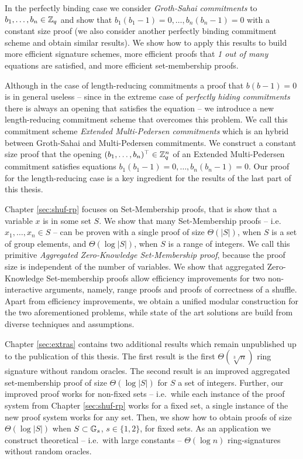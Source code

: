 In the perfectly binding case we consider \emph{Groth-Sahai commitments} to $b_1,\ldots,\allowbreak b_n\allowbreak\in\mathbb{Z}_q$ and show that $b_1(b_1-1)=0,\ldots,b_n(b_n-1)=0$ with a constant size proof (we also consider another perfectly binding commitment scheme and obtain similar results). We show how to apply this results to build more efficient signature schemes, more efficient proofs that \emph{1 out of many} equations are satisfied, and more efficient set-membership proofs.

Although in the case of length-reducing commitments a proof that $b(b-1)=0$ is in general useless -- since in the extreme case of \emph{perfectly hiding commitments} there is always an opening that satisfies the equation -- we introduce a new length-reducing commitment scheme that overcomes this problem. We call this commitment scheme \emph{Extended Multi-Pedersen commitments} which is an hybrid between Groth-Sahai and Multi-Pedersen commitments. We construct a constant size proof that the opening $(b_1,\ldots,b_n)^\top\in\mathbb{Z}_q^n$ of an Extended Multi-Pedersen commitment satisfies equations $b_1(b_1-1)=0,\ldots,b_n(b_n-1)=0$.
Our proof for the length-reducing case is a key ingredient for the results of the last part of this thesis.
 
Chapter \ref{sec:shuf-rp} focuses on Set-Membership proofs, that is show that a variable $x$ is in some set $S$. We show that many Set-Membership proofs -- i.e.~$x_1,\ldots,x_n\in S$ -- can be proven with a single proof of size $\Theta(|S|)$, when $S$ is a set of group elements, and $\Theta(\log |S|)$, when $S$ is a range of integers. We call this primitive \emph{Aggregated Zero-Knowledge Set-Membership proof}, because the proof size is independent of the number of variables. We show that aggregated Zero-Knowledge Set-membership proofs allow efficiency improvements for two non-interactive arguments, namely, range proofs and proofs of correctness of a shuffle. Apart from efficiency improvements, we obtain a unified modular construction for the two aforementioned problems, while state of the art solutions are build from diverse techniques and assumptions.

Chapter \ref{sec:extras} contains two additional results which remain unpublished up to the publication of this thesis. The first result is the first $\Theta(\sqrt[3]{n})$ ring signature without random oracles. The second result is an improved aggregated set-membership proof of size $\Theta(\log |S|)$ for $S$ a set of integers. Further, our improved proof works for non-fixed sets -- i.e.~while each instance of the proof system from Chapter \ref{sec:shuf-rp} works for a fixed set, a single instance of the new proof system works for any set. Then, we show how to obtain proofs of size $\Theta(\log|S|)$ when $S\subset\mathbb{G}_s$, $s\in\{1,2\}$, for fixed sets. As an application we construct theoretical -- i.e.~with large constants -- $\Theta(\log n)$ ring-signatures without random oracles.
